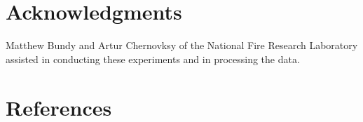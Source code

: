 \documentclass[12pt]{article}
\begin{document}


\pagebreak

\section*{Acknowledgments}
\noindent Matthew Bundy and Artur Chernovksy of the National Fire Research Laboratory assisted in conducting these experiments and in processing the data.   \\

\section*{References}



\end{document}
